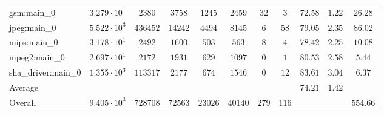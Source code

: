 \begin{tabular}{|l|c|c|c|c|c|c|c|c|c|c|}
gsm:main\_0             & $ 3.279 \cdot 10^{1} $ & $ 2380   $ & $ 3758  $ & $ 1245  $ & $ 2459  $ & $ 32  $ & $ 3   $ & $ 72.58       $ & $ 1.22    $ & $ 26.28   $ \\
jpeg:main\_0            & $ 5.522 \cdot 10^{3} $ & $ 436452 $ & $ 14242 $ & $ 4494  $ & $ 8145  $ & $ 6   $ & $ 58  $ & $ 79.05       $ & $ 2.35    $ & $ 86.02   $ \\
mips:main\_0            & $ 3.178 \cdot 10^{1} $ & $ 2492   $ & $ 1600  $ & $ 503   $ & $ 563   $ & $ 8   $ & $ 4   $ & $ 78.42       $ & $ 2.25    $ & $ 10.08   $ \\
mpeg2:main\_0           & $ 2.697 \cdot 10^{1} $ & $ 2172   $ & $ 1931  $ & $ 629   $ & $ 1097  $ & $ 0   $ & $ 1   $ & $ 80.53       $ & $ 2.58    $ & $ 5.44    $ \\
sha\_driver:main\_0     & $ 1.355 \cdot 10^{3} $ & $ 113317 $ & $ 2177  $ & $ 674   $ & $ 1546  $ & $ 0   $ & $ 12  $ & $ 83.61       $ & $ 3.04    $ & $ 6.37    $ \\
\hline
Average                 & $                    $ & $        $ & $       $ & $       $ & $       $ & $     $ & $     $ & $ 74.21       $ & $ 1.42    $ & $         $ \\
\hline
Overall                 & $ 9.405 \cdot 10^{3} $ & $ 728708 $ & $ 72563 $ & $ 23026 $ & $ 40140 $ & $ 279 $ & $ 116 $ & $             $ & $         $ & $ 554.66  $ \\
\hline
\end{tabular}
